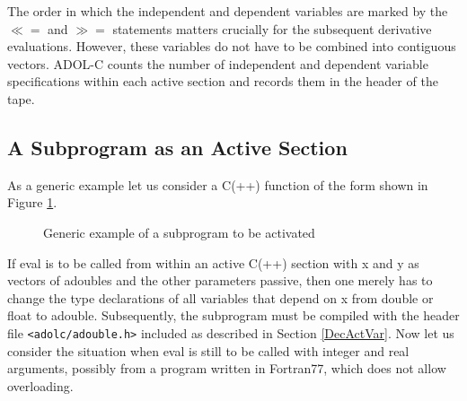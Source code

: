 \documentclass[11pt,twoside]{article}
\begin{document}
The order in which the independent and dependent variables are marked
by the \boldmath $\ll=$ \unboldmath and \boldmath $\gg=$ \unboldmath statements matters crucially for the subsequent
derivative evaluations. However, these variables do not have to be
combined into contiguous vectors. ADOL-C counts the number of
independent and dependent variable specifications within each active
section and records them in the header of the tape.
%
\subsection{A Subprogram as an Active Section} 
%
As a generic example let us consider a C(++) function of the form
shown in Figure \ref{code1}.
%
\begin{figure}[hbt]
\caption{Generic example of a subprogram to be activated}
\label{code1}
\end{figure}
%

If {\sf eval} is to be called from within an active C(++)
section with {\sf x}
and {\sf y} as vectors of {\sf adouble}s and the other parameters
passive, then one merely has to change the type declarations of all
variables that depend on {\sf x} from {\sf double} or {\sf float} to
{\sf adouble}. Subsequently, the subprogram must be compiled with the
header file \verb=<adolc/adouble.h>= included as described
in Section \ref{DecActVar}. Now let us consider the situation when {\sf eval} is
still to be called with integer and real arguments, possibly from
a program written in Fortran77, which  does not allow overloading. 
\end{document}
